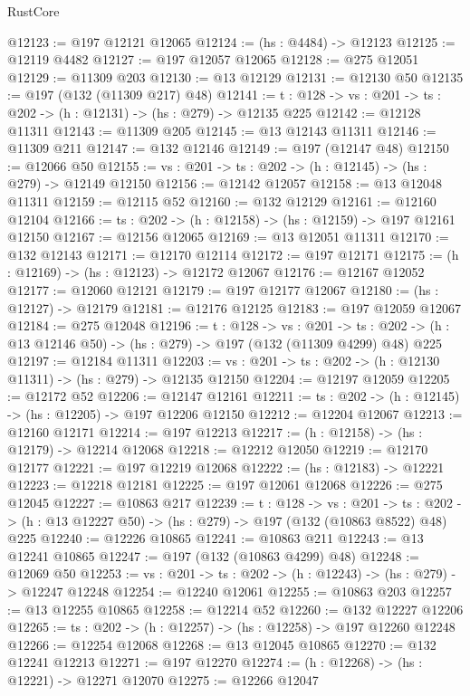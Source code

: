 \begin{lexlean}{RustCore}
\begin{coremodule}
@12123 := @197 @12121 @12065
@12124 := (hs : @4484) -> @12123
@12125 := @12119 @4482
@12127 := @197 @12057 @12065
@12128 := @275 @12051
@12129 := @11309 @203
@12130 := @13 @12129
@12131 := @12130 @50
@12135 := @197 (@132 (@11309 @217) @48)
@12141 := {t : @128} -> {vs : @201} -> {ts : @202} -> (h : @12131) -> (hs : @279) -> @12135 @225
@12142 := @12128 @11311
@12143 := @11309 @205
@12145 := @13 @12143 @11311
@12146 := @11309 @211
@12147 := @132 @12146
@12149 := @197 (@12147 @48)
@12150 := @12066 @50
@12155 := {vs : @201} -> {ts : @202} -> (h : @12145) -> (hs : @279) -> @12149 @12150
@12156 := @12142 @12057
@12158 := @13 @12048 @11311
@12159 := @12115 @52
@12160 := @132 @12129
@12161 := @12160 @12104
@12166 := {ts : @202} -> (h : @12158) -> (hs : @12159) -> @197 @12161 @12150
@12167 := @12156 @12065
@12169 := @13 @12051 @11311
@12170 := @132 @12143
@12171 := @12170 @12114
@12172 := @197 @12171
@12175 := (h : @12169) -> (hs : @12123) -> @12172 @12067
@12176 := @12167 @12052
@12177 := @12060 @12121
@12179 := @197 @12177 @12067
@12180 := (hs : @12127) -> @12179
@12181 := @12176 @12125
@12183 := @197 @12059 @12067
@12184 := @275 @12048
@12196 := {t : @128} ->
  {vs : @201} ->
  {ts : @202} -> (h : @13 @12146 @50) -> (hs : @279) -> @197 (@132 (@11309 @4299) @48) @225
@12197 := @12184 @11311
@12203 := {vs : @201} -> {ts : @202} -> (h : @12130 @11311) -> (hs : @279) -> @12135 @12150
@12204 := @12197 @12059
@12205 := @12172 @52
@12206 := @12147 @12161
@12211 := {ts : @202} -> (h : @12145) -> (hs : @12205) -> @197 @12206 @12150
@12212 := @12204 @12067
@12213 := @12160 @12171
@12214 := @197 @12213
@12217 := (h : @12158) -> (hs : @12179) -> @12214 @12068
@12218 := @12212 @12050
@12219 := @12170 @12177
@12221 := @197 @12219 @12068
@12222 := (hs : @12183) -> @12221
@12223 := @12218 @12181
@12225 := @197 @12061 @12068
@12226 := @275 @12045
@12227 := @10863 @217
@12239 := {t : @128} ->
  {vs : @201} ->
  {ts : @202} -> (h : @13 @12227 @50) -> (hs : @279) -> @197 (@132 (@10863 @8522) @48) @225
@12240 := @12226 @10865
@12241 := @10863 @211
@12243 := @13 @12241 @10865
@12247 := @197 (@132 (@10863 @4299) @48)
@12248 := @12069 @50
@12253 := {vs : @201} -> {ts : @202} -> (h : @12243) -> (hs : @279) -> @12247 @12248
@12254 := @12240 @12061
@12255 := @10863 @203
@12257 := @13 @12255 @10865
@12258 := @12214 @52
@12260 := @132 @12227 @12206
@12265 := {ts : @202} -> (h : @12257) -> (hs : @12258) -> @197 @12260 @12248
@12266 := @12254 @12068
@12268 := @13 @12045 @10865
@12270 := @132 @12241 @12213
@12271 := @197 @12270
@12274 := (h : @12268) -> (hs : @12221) -> @12271 @12070
@12275 := @12266 @12047

\end{coremodule}
\end{lexlean}
